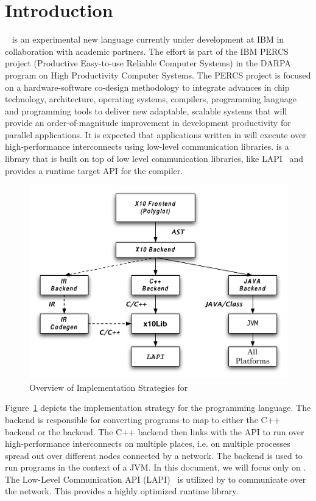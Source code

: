 \section{Introduction}

\Xten{}~\cite{X10} is an experimental new language currently under development at
IBM in collaboration with academic partners. The \Xten{} effort is part of
the IBM PERCS project (Productive Easy-to-use Reliable Computer Systems)
in the DARPA program on High Productivity Computer Systems. The PERCS
project is focused on a hardware-software co-design methodology to
integrate advances in chip technology, architecture, operating systems,
compilers, programming language and programming tools to deliver new
adaptable, scalable systems that will provide an order-of-magnitude
improvement in development productivity for parallel applications. It is
expected that applications written in \Xten{} will execute over
high-performance interconnects using low-level communication libraries.
\Xtenlib{} is a library that is built on top of low level communication
libraries, like LAPI~\cite{LAPI} and provides a runtime target API for
the \Xten{} compiler.

\begin{figure}
\center
\includegraphics[scale=0.5]{figs/x10-block.pdf}
\caption{Overview of Implementation Strategies for \Xten{}}
\label{fig:x10-block}
\end{figure}

Figure~\ref{fig:x10-block} depicts the implementation strategy for the
\Xten{} programming language. The \Xten{} backend is responsible for
converting \Xten{} programs to map to either the C++ backend or the
{} backend. The C++ backend then links with the \Xtenlib{} API
to run over high-performance interconnects on multiple places, i.e. on
multiple processes spread out over different nodes connected by a
network. The {} backend is used to run \Xten{} programs in the
context of a JVM. In this document, we will focus only on \Xtenlib{}.
The Low-Level Communication API (LAPI)~\cite{LAPI} is utilized by
\Xtenlib{} to communicate over the network. This provides a highly
optimized runtime library.

